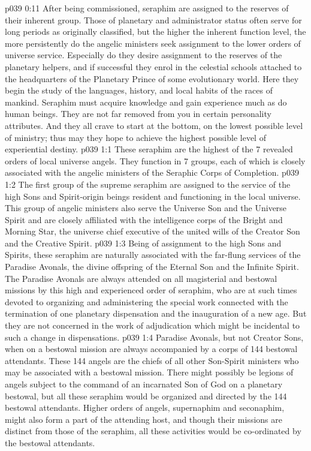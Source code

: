 \vs p039 0:11 After being commissioned, seraphim are assigned to the reserves of their inherent group. Those of planetary and administrator status often serve for long periods as originally classified, but the higher the inherent function level, the more persistently do the angelic ministers seek assignment to the lower orders of universe service. Especially do they desire assignment to the reserves of the planetary helpers, and if successful they enrol in the celestial schools attached to the headquarters of the Planetary Prince of some evolutionary world. Here they begin the study of the languages, history, and local habits of the races of mankind. Seraphim must acquire knowledge and gain experience much as do human beings. They are not far removed from you in certain personality attributes. And they all crave to start at the bottom, on the lowest possible level of ministry; thus may they hope to achieve the highest possible level of experiential destiny.
\vs p039 1:1 These seraphim are the highest of the 7 revealed orders of local universe angels. They function in 7 groups, each of which is closely associated with the angelic ministers of the Seraphic Corps of Completion.
\vs p039 1:2 \bibnobreakspace {} The first group of the supreme seraphim are assigned to the service of the high Sons and Spirit\hyp{}origin beings resident and functioning in the local universe. This group of angelic ministers also serve the Universe Son and the Universe Spirit and are closely affiliated with the intelligence corps of the Bright and Morning Star, the universe chief executive of the united wills of the Creator Son and the Creative Spirit.
\vs p039 1:3 Being of assignment to the high Sons and Spirits, these seraphim are naturally associated with the far\hyp{}flung services of the Paradise Avonals, the divine offspring of the Eternal Son and the Infinite Spirit. The Paradise Avonals are always attended on all magisterial and bestowal missions by this high and experienced order of seraphim, who are at such times devoted to organizing and administering the special work connected with the termination of one planetary dispensation and the inauguration of a new age. But they are not concerned in the work of adjudication which might be incidental to such a change in dispensations.
\vs p039 1:4 \pc {} Paradise Avonals, but not Creator Sons, when on a bestowal mission are always accompanied by a corps of 144 bestowal attendants. These 144 angels are the chiefs of all other Son\hyp{}Spirit ministers who may be associated with a bestowal mission. There might possibly be legions of angels subject to the command of an incarnated Son of God on a planetary bestowal, but all these seraphim would be organized and directed by the 144 bestowal attendants. Higher orders of angels, supernaphim and seconaphim, might also form a part of the attending host, and though their missions are distinct from those of the seraphim, all these activities would be co\hyp{}ordinated by the bestowal attendants.
